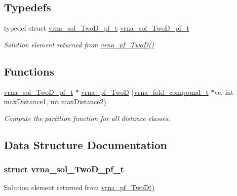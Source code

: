 \subsection*{Typedefs}
\begin{DoxyCompactItemize}
\item 
typedef struct \hyperlink{group__kl__neighborhood__pf_structvrna__sol__TwoD__pf__t}{vrna\+\_\+sol\+\_\+\+Two\+D\+\_\+pf\+\_\+t} \hyperlink{group__kl__neighborhood__pf_ga5e449fbd695406aabd2bcabddc374621}{vrna\+\_\+sol\+\_\+\+Two\+D\+\_\+pf\+\_\+t}
\begin{DoxyCompactList}\small\item\em Solution element returned from \hyperlink{group__kl__neighborhood__pf_ga0bc3427689bd09da09b8b3094a27f836}{vrna\+\_\+pf\+\_\+\+Two\+D()} \end{DoxyCompactList}\end{DoxyCompactItemize}
\subsection*{Functions}
\begin{DoxyCompactItemize}
\item 
\hyperlink{group__kl__neighborhood__pf_structvrna__sol__TwoD__pf__t}{vrna\+\_\+sol\+\_\+\+Two\+D\+\_\+pf\+\_\+t} $\ast$ \hyperlink{group__kl__neighborhood__pf_ga0bc3427689bd09da09b8b3094a27f836}{vrna\+\_\+pf\+\_\+\+TwoD} (\hyperlink{group__fold__compound_ga1b0cef17fd40466cef5968eaeeff6166}{vrna\+\_\+fold\+\_\+compound\+\_\+t} $\ast$vc, int max\+Distance1, int max\+Distance2)
\begin{DoxyCompactList}\small\item\em Compute the partition function for all distance classes. \end{DoxyCompactList}\end{DoxyCompactItemize}


\subsection{Data Structure Documentation}
\label{structvrna__sol__TwoD__pf__t}
\subsubsection{struct vrna\+\_\+sol\+\_\+\+Two\+D\+\_\+pf\+\_\+t}
Solution element returned from \hyperlink{group__kl__neighborhood__pf_ga0bc3427689bd09da09b8b3094a27f836}{vrna\+\_\+pf\+\_\+\+Two\+D()} 

